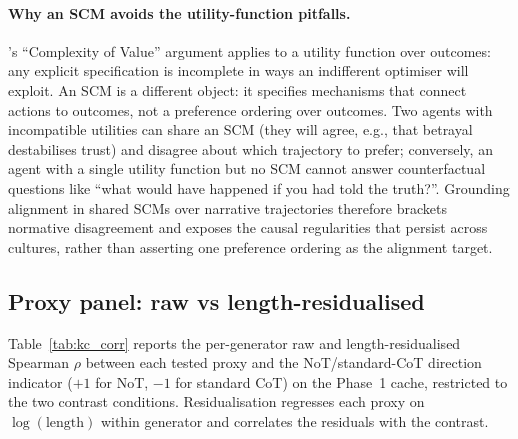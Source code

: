 \documentclass[11pt]{article}
\begin{document}
\paragraph{Why an SCM avoids the utility-function pitfalls.}
\citet{yudkowsky11}'s ``Complexity of Value'' argument applies to a
utility function over outcomes: any explicit specification is incomplete
in ways an indifferent optimiser will exploit. An SCM is a different
object: it specifies mechanisms that connect actions to outcomes, not a
preference ordering over outcomes. Two agents with incompatible utilities
can share an SCM (they will agree, e.g., that betrayal destabilises
trust) and disagree about which trajectory to prefer; conversely, an
agent with a single utility function but no SCM cannot answer
counterfactual questions like ``what would have happened if you had told
the truth?''. Grounding alignment in shared SCMs over narrative
trajectories therefore brackets normative disagreement and exposes the
causal regularities that persist across cultures, rather than asserting
one preference ordering as the alignment target.

\subsection{Proxy panel: raw vs length-residualised}
\label{app:kc_panel}

Table~\ref{tab:kc_corr} reports the per-generator raw and
length-residualised Spearman $\rho$ between each tested proxy and the
NoT/standard-CoT direction indicator ($+1$ for NoT, $-1$ for
standard CoT) on the Phase~1 cache, restricted to the two contrast
conditions. Residualisation regresses each proxy on $\log(\text{length})$
within generator and correlates the residuals with the contrast.
\end{document}
